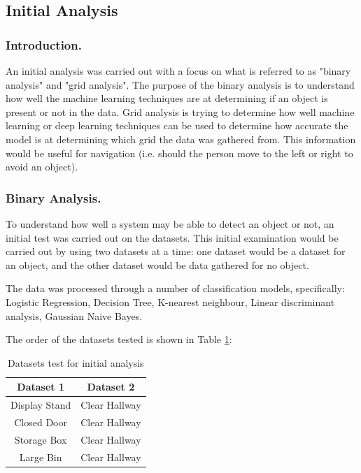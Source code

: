 \documentclass{svproc}
\begin{document}
\subsection{Initial Analysis}
\subsubsection{Introduction.}
An initial analysis was carried out with a focus on what is referred to as "binary analysis" and "grid analysis". The purpose of the binary analysis 
is to understand how well the machine learning techniques are at determining if an object is present or not in the data. Grid analysis is trying 
to determine how well machine learning or deep learning techniques can be used to determine how accurate the model is at determining which grid 
the data was gathered from. This information would be useful for navigation (i.e. should the person move to the left or right to avoid an object).

\subsubsection{Binary Analysis.}
To understand how well a system may be able to detect an object or not, an initial test was carried out on the datasets. This initial examination 
would be carried out by using two datasets at a time: one dataset would be a dataset for an object, and the other dataset would be data gathered 
for no object. 

The data was processed through a number of classification models, specifically: Logistic Regression, Decision Tree, K-nearest neighbour, Linear 
discriminant analysis, Gaussian Naive Bayes.

The order of the datasets tested is shown in Table \ref{table:2}:
\begin{table}[ht]
\centering
\begin{tabular}{||c c||} 
 \hline
 Dataset 1 & Dataset 2  \\ [0.5ex] 
 \hline\hline
 Display Stand & Clear Hallway  \\ 
 \hline
 Closed Door & Clear Hallway \\
 \hline
 Storage Box & Clear Hallway \\
 \hline
 Large Bin & Clear Hallway \\ [1ex] 
 \hline
\end{tabular}
\caption{Datasets test for initial analysis}
\label{table:2}
\end{table}
\end{document}
